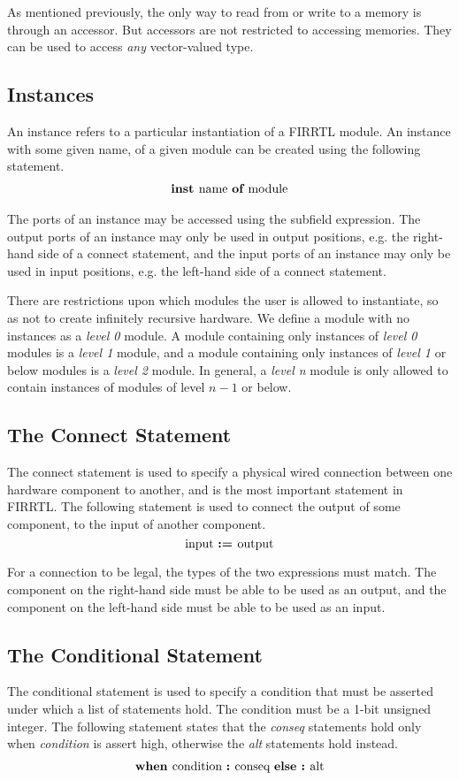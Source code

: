 \documentclass[12pt]{article}
\begin{document}
As mentioned previously, the only way to read from or write to a memory is through an accessor. But accessors are not restricted to accessing memories. They can be used to access {\em any} vector-valued type. 

\subsection{Instances}
An instance refers to a particular instantiation of a FIRRTL module. An instance with some given name, of a given module can be created using the following statement.
\[
\begin{aligned}
\text{\bf inst\ } \text{name } \text{\bf of\ } \text{module}
\end{aligned}
\]

The ports of an instance may be accessed using the subfield expression. The output ports of an instance may only be used in output positions, e.g. the right-hand side of a connect statement, and the input ports of an instance may only be used in input positions, e.g. the left-hand side of a connect statement.

There are restrictions upon which modules the user is allowed to instantiate, so as not to create infinitely recursive hardware. We define a module with no instances as a {\em level 0} module. A module containing only instances of {\em level 0} modules is a {\em level 1} module, and a module containing only instances of {\em level 1} or below modules is a {\em level 2} module. In general, a {\em level n} module is only allowed to contain instances of modules of level $n-1$ or below. 

\subsection{The Connect Statement}
The connect statement is used to specify a physical wired connection between one hardware component to another, and is the most important statement in FIRRTL. The following statement is used to connect the output of some component, to the input of another component. 
\[
\text{input } \text{\bf :=\ } \text{output} 
\]

For a connection to be legal, the types of the two expressions must match. The component on the right-hand side must be able to be used as an output, and the component on the left-hand side must be able to be used as an input.

\subsection{The Conditional Statement}
The conditional statement is used to specify a condition that must be asserted under which a list of statements hold. The condition must be a 1-bit unsigned integer. The following statement states that the {\em conseq} statements hold only when {\em condition} is assert high, otherwise the {\em alt} statements hold instead.
\[
\begin{aligned}
\text{\bf when\ } \text{condition } \text{\bf :\ } \text{conseq } \text{\bf else :\ } \text{alt}
\end{aligned}
\]
\end{document}
